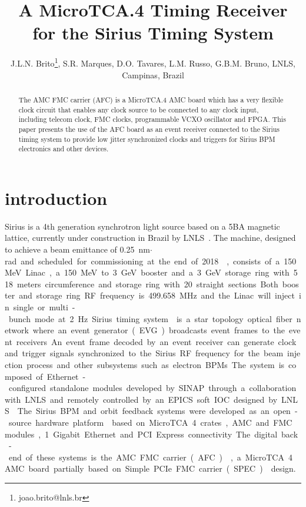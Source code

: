 \documentclass[a4paper,
               biblatex,      %
               ]{jacow}
\begin{document}
\title{A MicroTCA.4  Timing Receiver for the Sirius Timing System}

\author{J.L.N. Brito\thanks{joao.brito@lnls.br}, S.R. Marques, D.O. Tavares, L.M. Russo, G.B.M. Bruno, LNLS, Campinas, Brazil}
	
\maketitle


\begin{abstract}
   The AMC FMC carrier (AFC) is a MicroTCA.4 AMC board which has a very flexible clock circuit that enables any clock source to be connected to any clock input, including telecom clock, FMC clocks, programmable VCXO oscillator and FPGA. This paper presents the use of the AFC board as an event receiver connected to the Sirius timing system to provide low jitter synchronized clocks and triggers for Sirius BPM electronics and other devices.
\end{abstract}


\section{introduction}
Sirius is a 4th  generation  synchrotron light source  based  on  a 5BA magnetic lattice, currently under construction in Brazil by LNLS~\cite{sirius_ipac16}. The machine, designed to achieve a beam emittance of \SI{0.25}{nm$\cdot$rad} and scheduled for commissioning at the end of 2018~\cite{rodrigues2016sirius}, consists of a 150 MeV Linac, a 150 MeV to 3 GeV booster and a 3 GeV storage ring with 518 meters circumference and storage ring with 20 straight sections. Both booster and storage ring RF frequency is \SI{499.658}{MHz} and the Linac will inject in single or multi-bunch mode at \SI{2}{Hz}.

Sirius timing system~\cite{timing_icalepcs15} is a star topology optical fiber network where an event generator (EVG) broadcasts event frames to the event receivers. An event frame decoded by an event receiver can generate clock and trigger signals synchronized to the Sirius RF frequency for the beam injection process and other subsystems such as electron BPMs. The system is composed of Ethernet-configured standalone modules developed by SINAP through a collaboration with LNLS and remotely controlled by an EPICS soft IOC designed by LNLS~\cite{sinap-timing-epics-ioc}.

The Sirius BPM and orbit feedback systems were developed as an open-source hardware platform~\cite{ebpm_icalepcs13} based on MicroTCA.4 crates, AMC and FMC modules, 1 Gigabit Ethernet and PCI Express connectivity. The digital back-end of these systems is the AMC FMC carrier (AFC)~\cite{afc-git}, a MicroTCA.4 AMC board partially based on Simple PCIe FMC carrier (SPEC)~\cite{spec} design. 
\end{document}
